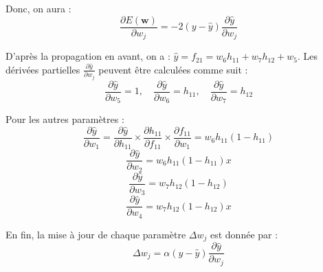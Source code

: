 {{\begin{enumerate}
{Donc, on aura :
\[
\frac{\partial E(\mathbf{w})}{\partial w_j} = -2(y - \hat{y}) \frac{\partial \hat{y}}{\partial w_j}
\]

D’après la propagation en avant, on a : $\hat{y} = f_{21} = w_6 h_{11} + w_7 h_{12} + w_5$.  
Les dérivées partielles $\frac{\partial \hat{y}}{\partial w_j}$ peuvent être calculées comme suit :
\[
\frac{\partial \hat{y}}{\partial w_5} = 1, \quad
\frac{\partial \hat{y}}{\partial w_6} = h_{11}, \quad
\frac{\partial \hat{y}}{\partial w_7} = h_{12}
\]

Pour les autres paramètres :
\[
\frac{\partial \hat{y}}{\partial w_1} = \frac{\partial \hat{y}}{\partial h_{11}} \times \frac{\partial h_{11}}{\partial f_{11}} \times \frac{\partial f_{11}}{\partial w_1} = w_6 h_{11}(1 - h_{11})
\]
\[
\frac{\partial \hat{y}}{\partial w_2} = w_6 h_{11}(1 - h_{11}) x
\]
\[
\frac{\partial \hat{y}}{\partial w_3} = w_7 h_{12}(1 - h_{12})
\]
\[
\frac{\partial \hat{y}}{\partial w_4} = w_7 h_{12}(1 - h_{12}) x
\]

En fin, la mise à jour de chaque paramètre $\Delta w_j$ est donnée par :
\[
\Delta w_j = \alpha (y - \hat{y}) \frac{\partial \hat{y}}{\partial w_j}
\]
}

\end{enumerate}


  }
}
